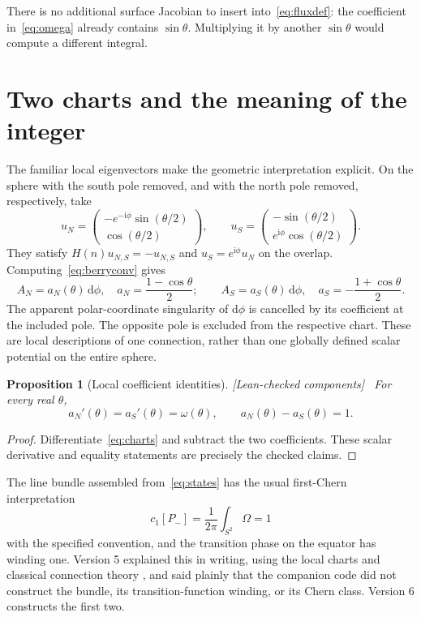 \documentclass[11pt]{article}
\newtheorem{proposition}[theorem]{Proposition}
\theoremstyle{definition}\newtheorem{definition}[theorem]{Definition}
\theoremstyle{remark}\newtheorem{remark}[theorem]{Remark}
\newcommand{\ii}{\mathrm{i}}
\newcommand{\dd}{\mathrm{d}}
\newcommand{\checked}{\textnormal{\small[Lean-checked components]}\ }
\begin{document}
There is no additional surface Jacobian to insert into~\eqref{eq:fluxdef}: the coefficient in~\eqref{eq:omega} already contains $\sin\theta$. Multiplying it by another $\sin\theta$ would compute a different integral.

\section{Two charts and the meaning of the integer}\label{sec:charts}
The familiar local eigenvectors make the geometric interpretation explicit. On the sphere with the south pole removed, and with the north pole removed, respectively, take
\begin{equation}\label{eq:states}
 u_N=\begin{pmatrix}-e^{-\ii\phi}\sin(\theta/2)\\\cos(\theta/2)\end{pmatrix},
 \qquad
 u_S=\begin{pmatrix}-\sin(\theta/2)\\e^{\ii\phi}\cos(\theta/2)\end{pmatrix}.
\end{equation}
They satisfy $H(n)u_{N,S}=-u_{N,S}$ and $u_S=e^{\ii\phi}u_N$ on the overlap. Computing~\eqref{eq:berryconv} gives
\begin{equation}\label{eq:charts}
 A_N=a_N(\theta)\,\dd\phi,\quad a_N=\frac{1-\cos\theta}{2};
 \qquad A_S=a_S(\theta)\,\dd\phi,\quad a_S=-\frac{1+\cos\theta}{2}.
\end{equation}
The apparent polar-coordinate singularity of $\dd\phi$ is cancelled by its coefficient at the included pole. The opposite pole is excluded from the respective chart. These are local descriptions of one connection, rather than one globally defined scalar potential on the entire sphere.

\begin{proposition}[Local coefficient identities]\label{prop:charts}\checked
For every real $\theta$,
\begin{equation}
 a_N'(\theta)=a_S'(\theta)=\omega(\theta),\qquad a_N(\theta)-a_S(\theta)=1.
\end{equation}
\end{proposition}
\begin{proof}
Differentiate~\eqref{eq:charts} and subtract the two coefficients. These scalar derivative and equality statements are precisely the checked claims.
\end{proof}
The line bundle assembled from~\eqref{eq:states} has the usual first-Chern interpretation
\begin{equation}\label{eq:chern}
 c_1[P_-]=\frac1{2\pi}\int_{S^2}\Omega=1
\end{equation}
with the specified convention, and the transition phase on the equator has winding one. Version 5
explained this in writing, using the local charts and classical connection theory \cite{simon,wuyang},
and said plainly that the companion code did not construct the bundle, its transition-function
winding, or its Chern class. Version 6 constructs the first two.
\end{document}
